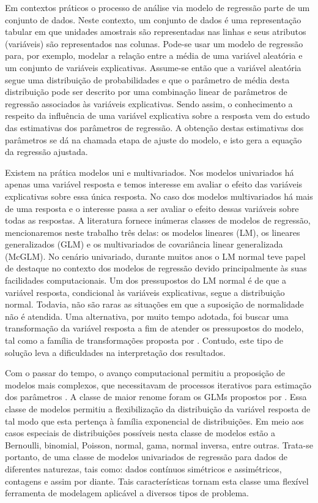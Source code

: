 Em contextos práticos o processo de análise via modelo de regressão parte de um conjunto de dados. Neste contexto, um conjunto de dados é uma representação tabular em que unidades amostrais são representadas nas linhas e seus atributos (variáveis) são representados nas colunas. Pode-se usar um modelo de regressão para, por exemplo, modelar a relação entre a média de uma variável aleatória e um conjunto de variáveis explicativas. Assume-se então que a variável aleatória segue uma distribuição de probabilidades e que o parâmetro de média desta distribuição pode ser descrito por uma combinação linear de parâmetros de regressão associados às variáveis explicativas. Sendo assim, o conhecimento a respeito da influência de uma variável explicativa sobre a resposta vem do estudo das estimativas dos parâmetros de regressão. A obtenção destas estimativas dos parâmetros se dá na chamada etapa de ajuste do modelo, e isto gera a equação da regressão ajustada.

Existem na prática modelos uni e multivariados. Nos modelos univariados há apenas uma variável resposta e temos interesse em avaliar o efeito das variáveis explicativas sobre essa única resposta. No caso dos modelos multivariados há mais de uma resposta e o interesse passa a ser avaliar o efeito dessas variáveis sobre todas as respostas. A literatura fornece inúmeras classes de modelos de regressão, mencionaremos neste trabalho três delas: os modelos lineares (LM), os lineares generalizados (GLM) e os multivariados de covariância linear generalizada (McGLM). No cenário univariado, durante muitos anos o LM normal \citep{galton} teve papel de destaque no contexto dos modelos de regressão devido principalmente às suas facilidades computacionais. Um dos pressupostos do LM normal é de que a variável resposta, condicional às variáveis explicativas, segue a distribuição normal. Todavia, não são raras as situações em que a suposição de normalidade não é atendida. Uma alternativa, por muito tempo adotada, foi buscar uma transformação da variável resposta a fim de atender os pressupostos do modelo, tal como a família de transformações proposta por \citet{boxcox64}. Contudo, este tipo de solução leva a dificuldades na interpretação dos resultados.

Com o passar do tempo, o avanço computacional permitiu a proposição de modelos mais complexos, que necessitavam de processos iterativos para estimação dos parâmetros \citep{paula}. A classe de maior renome foram os GLMs propostos por \citet{Nelder72}. Essa classe de modelos permitiu a flexibilização da distribuição da variável resposta de tal modo que esta pertença à família exponencial de distribuições. Em meio aos casos especiais de distribuições possíveis nesta classe de modelos estão a Bernoulli, binomial, Poisson, normal, gama, normal inversa, entre outras. Trata-se portanto, de uma classe de modelos univariados de regressão para dados de diferentes naturezas, tais como: dados contínuos simétricos e assimétricos, contagens e assim por diante. Tais características tornam esta classe uma flexível ferramenta de modelagem aplicável a diversos tipos de problema. 

